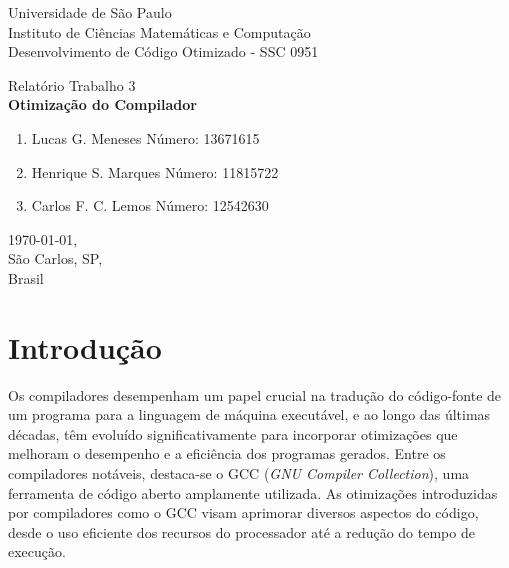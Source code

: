 \documentclass[12pt,a4paper]{article}
\begin{document}

\thispagestyle{empty}
\begin{minipage}{\textwidth}\centering
Universidade de São Paulo \\
Instituto de Ciências Matemáticas e Computação \\
Desenvolvimento de Código Otimizado - SSC 0951 \\
\end{minipage}

\vspace{5cm}

\begin{minipage}{\textwidth}\centering
\Large Relatório Trabalho 3  \\
\vspace{2cm}
\Large \textbf{Otimização do Compilador}
\end{minipage}

\vspace{3cm}

\begin{minipage}{\linewidth}\centering
\begin{enumerate}
     \item Lucas G. Meneses   \space \space \space \space \space \space  Número: 13671615
      \item Henrique S. Marques  \space \space Número: 11815722
      \item Carlos F. C. Lemos  \space \space \space \space Número: 12542630
\end{enumerate}
\end{minipage}

\vfill

\begin{minipage}{\linewidth}
\centering\today, \\
São Carlos, SP, \\
Brasil
\end{minipage}

\clearpage
\thispagestyle{empty}

\tableofcontents

\section{Introdução}

Os compiladores desempenham um papel crucial na tradução do código-fonte de um programa para a linguagem de máquina executável, e ao longo das últimas décadas, têm evoluído significativamente para incorporar otimizações que melhoram o desempenho e a eficiência dos programas gerados. Entre os compiladores notáveis, destaca-se o GCC (\textit{GNU Compiler Collection}), uma ferramenta de código aberto amplamente utilizada. As otimizações introduzidas por compiladores como o GCC visam aprimorar diversos aspectos do código, desde o uso eficiente dos recursos do processador até a redução do tempo de execução.
\end{document}
